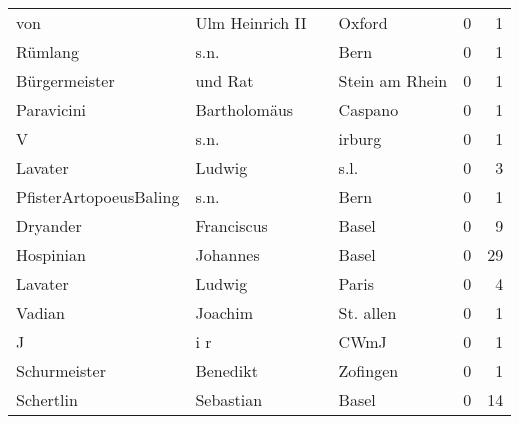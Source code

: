 \begin{center}
\begin{tiny}
\begin{longtabu}{llllrr}
                      von &                    Ulm Heinrich II &             &                                      Oxford &          0 &         1 \\
                  Rümlang &                               s.n. &             &                                        Bern &          0 &         1 \\
            Bürgermeister &                            und Rat &             &                              Stein am Rhein &          0 &         1 \\
               Paravicini &                       Bartholomäus &             &                                     Caspano &          0 &         1 \\
                        V &                               s.n. &             &                                      irburg &          0 &         1 \\
                  Lavater &                             Ludwig &             &                                        s.l. &          0 &         3 \\
   PfisterArtopoeusBaling &                               s.n. &             &                                        Bern &          0 &         1 \\
                 Dryander &                         Franciscus &             &                                       Basel &          0 &         9 \\
                Hospinian &                           Johannes &             &                                       Basel &          0 &        29 \\
                  Lavater &                             Ludwig &             &                                       Paris &          0 &         4 \\
                   Vadian &                            Joachim &             &                                   St. allen &          0 &         1 \\
                        J &                                i r &             &                                        CWmJ &          0 &         1 \\
             Schurmeister &                           Benedikt &             &                                    Zofingen &          0 &         1 \\
                Schertlin &                          Sebastian &             &                                       Basel &          0 &        14 \\

\end{longtabu}
\end{tiny}
\end{center}
